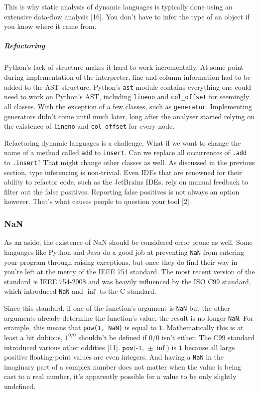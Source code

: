 \documentclass[]{article}
\let\oldsubparagraph\subparagraph
\renewcommand{\subparagraph}[1]{\oldsubparagraph{#1}\mbox{}}
\begin{document}
This is why static analysis of dynamic languages is typically done using
an extensive data-flow analysis {[}16{]}. You don't have to infer the
type of an object if you know where it came from.

\subparagraph{Refactoring}\label{refactoring}

Python's lack of structure makes it hard to work incrementally. At some
point during implementation of the interpreter, line and column
information had to be added to the AST structure. Python's \texttt{ast}
module contains everything one could need to work on Python's AST,
including \texttt{lineno} and \texttt{col\_offset} for seemingly all
classes. With the exception of a few classes, such as
\texttt{generator}. Implementing generators didn't come until much
later, long after the analyser started relying on the existence of
\texttt{lineno} and \texttt{col\_offset} for every node.

Refactoring dynamic languages is a challenge. What if we want to change
the name of a method called \texttt{add} to \texttt{insert}. Can we
replace all occurrences of \texttt{.add} to \texttt{.insert}? That might
change other classes as well. As discussed in the previous section, type
inferencing is non-trivial. Even IDEs that are renowned for their
ability to refactor code, such as the JetBrains IDEs, rely on manual
feedback to filter out the false positives. Reporting false positives is
not always an option however. That's what causes people to question your
tool {[}2{]}.

\subsubsection{NaN}\label{nan}

As an aside, the existence of NaN should be considered error prone as
well. Some languages like Python and Java do a good job at preventing
\texttt{NaN} from entering your program through raising exceptions, but
once they do find their way in you're left at the mercy of the IEEE 754
standard. The most recent version of the standard is IEEE 754-2008 and
was heavily influenced by the ISO C99 standard, which introduced
\texttt{NaN} and \(\inf\) to the C standard.

Since this standard, if one of the function's argument is \texttt{NaN}
but the other arguments already determine the function's value, the
result is no longer \texttt{NaN}. For example, this means that
\texttt{pow(1,\ NaN)} is equal to \texttt{1}. Mathematically this is at
least a bit dubious, \(1^{0/0}\) shouldn't be defined if \(0/0\) isn't
either. The C99 standard introduced various other oddities {[}11{]}.
\(\texttt{pow(-1, }\pm \inf\texttt{)}\) is \texttt{1} because all large
positive floating-point values are even integers. And having a
\texttt{NaN} in the imaginary part of a complex number does not matter
when the value is being cast to a real number, it's apparently possible
for a value to be only slightly undefined.
\end{document}
